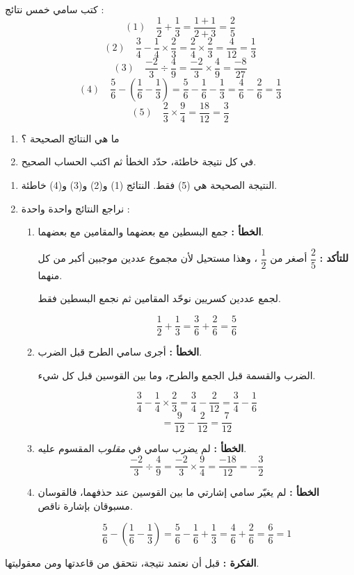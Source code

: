 \documentclass[12pt,a4paper]{article}
\begin{document}
\begin{corr}[title={البحث عن الخطأ}, stars=3, source={Axiomaths}]
كتب سامي خمس نتائج :
\[(1)\quad\dfrac{1}{2}+\dfrac{1}{3}=\dfrac{1+1}{2+3}=\dfrac{2}{5}\]
\[(2)\quad\dfrac{3}{4}-\dfrac{1}{4}\times\dfrac{2}{3}=\dfrac{2}{4}\times\dfrac{2}{3}=\dfrac{4}{12}=\dfrac{1}{3}\]
\[(3)\quad\dfrac{-2}{3}\div\dfrac{4}{9}=\dfrac{-2}{3}\times\dfrac{4}{9}=\dfrac{-8}{27}\]
\[(4)\quad\dfrac{5}{6}-\left(\dfrac{1}{6}-\dfrac{1}{3}\right)=\dfrac{5}{6}-\dfrac{1}{6}-\dfrac{1}{3}=\dfrac{4}{6}-\dfrac{2}{6}=\dfrac{1}{3}\]
\[(5)\quad\dfrac{2}{3}\times\dfrac{9}{4}=\dfrac{18}{12}=\dfrac{3}{2}\]
\begin{enumerate}
  \item ما هي النتائج الصحيحة ؟
  \item في كل نتيجة خاطئة، حدّد الخطأ ثم اكتب الحساب الصحيح.
\end{enumerate}
\axsol
\begin{enumerate}[itemsep=14pt]
  \item النتيجة الصحيحة هي (5) فقط. النتائج (1) و(2) و(3) و(4) خاطئة.
  \item نراجع النتائج واحدة واحدة :
  \begin{enumerate}[itemsep=12pt]
    \item[$(1)$] \textbf{الخطأ :} جمع البسطين مع بعضهما والمقامين مع بعضهما.

    \textbf{للتأكد :} $\dfrac{2}{5}$ أصغر من $\dfrac{1}{2}$ ، وهذا مستحيل لأن مجموع عددين موجبين أكبر من كل منهما.
    \begin{prop}[قاعدة]
    لجمع عددين كسريين نوحّد المقامين ثم نجمع البسطين فقط.
    \end{prop}
    \[\dfrac{1}{2}+\dfrac{1}{3}=\dfrac{3}{6}+\dfrac{2}{6}=\dfrac{5}{6}\]
    \item[$(2)$] \textbf{الخطأ :} أجرى سامي الطرح قبل الضرب.
    \begin{prop}
    الضرب والقسمة قبل الجمع والطرح، وما بين القوسين قبل كل شيء.
    \end{prop}
    \[\dfrac{3}{4}-\dfrac{1}{4}\times\dfrac{2}{3}=\dfrac{3}{4}-\dfrac{2}{12}=\dfrac{3}{4}-\dfrac{1}{6}\]
    \[=\dfrac{9}{12}-\dfrac{2}{12}=\dfrac{7}{12}\]
    \item[$(3)$] \textbf{الخطأ :} لم يضرب سامي في \emph{مقلوب} المقسوم عليه.
    \[\dfrac{-2}{3}\div\dfrac{4}{9}=\dfrac{-2}{3}\times\dfrac{9}{4}=\dfrac{-18}{12}=-\dfrac{3}{2}\]
    \item[$(4)$] \textbf{الخطأ :} لم يغيّر سامي إشارتي ما بين القوسين عند حذفهما، فالقوسان مسبوقان بإشارة ناقص.
    \begin{prop}
    \end{prop}
    \[\dfrac{5}{6}-\left(\dfrac{1}{6}-\dfrac{1}{3}\right)=\dfrac{5}{6}-\dfrac{1}{6}+\dfrac{1}{3}=\dfrac{4}{6}+\dfrac{2}{6}=\dfrac{6}{6}=1\]
  \end{enumerate}
\end{enumerate}
\textbf{الفكرة :} قبل أن نعتمد نتيجة، نتحقق من قاعدتها ومن معقوليتها.
\end{corr}
\end{document}
